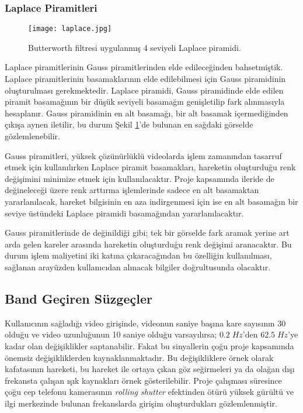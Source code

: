 \documentclass[a4paper, 12pt]{article}
\begin{document}
\subsubsection{Laplace Piramitleri}{\label{laplace-piramit}}

\begin{figure}[h]
	\begin{center}
	\texttt{[image: laplace.jpg]}
	\caption{Butterworth filtresi uygulanmış 4 seviyeli Laplace piramidi.}
		\label{laplace-piramit-ornek}
	\end{center}
\end{figure}
\vspace{-0.5cm}

Laplace piramitlerinin Gauss piramitlerinden elde edileceğinden bahsetmiştik. Laplace piramitlerinin basamaklarının elde edilebilmesi için Gauss piramidinin oluşturulması gerekmektedir. Laplace piramidi, Gauss piramidinde elde edilen piramit basamağının bir düşük seviyeli basamağın genişletilip fark alınmasıyla hesaplanır. Gauss piramidinin en alt basamağı, bir alt basamak içermediğinden çıkışa aynen iletilir, bu durum Şekil \ref{laplace-piramit-ornek}'de bulunan en sağdaki görselde gözlemlenebilir.

Gauss piramitleri, yüksek çözünürlüklü videolarda işlem zamanından tasarruf etmek için kullanılırken Laplace piramit basamakları, hareketin oluşturduğu renk değişimini minimize etmek için kullanılacaktır. Proje kapsamında ileride de değineleceği üzere renk arttırma işlemlerinde sadece en alt basamaktan yararlanılacak, hareket bilgisinin en aza indirgenmesi için ise en alt basamağın bir seviye üstündeki Laplace piramidi basamağından yararlanılacaktır. 

Gauss piramitlerinde de değinildiği gibi; tek bir görselde fark aramak yerine art arda gelen kareler arasında hareketin oluşturduğu renk değişimi aranacaktır. Bu durum işlem maliyetini iki katına çıkaracağından bu özelliğin kullanılması, sağlanan arayüzden kullanıcıdan alınacak bilgiler doğrultusunda olacaktır.



\subsection{Band Geçiren Süzgeçler}{\label{band-geciren-suzgec}}

Kullanıcının sağladığı video girişinde, videonun saniye başına kare sayısının 30 olduğu ve video uzunluğunun 10 saniye olduğu varsayılırsa; $0.2\; Hz$'den $62.5\; Hz$'ye kadar olan değişiklikler saptanabilir. Fakat bu sinyallerin çoğu proje kapsamında önemsiz değişikliklerden kaynaklanmaktadır. Bu değişikliklere örnek olarak kafatasının hareketi\cite{YQIF}, bu hareket ile ortaya çıkan göz seğirmeleri ya da olağan dışı frekansta çalışan ışık kaynakları örnek gösterilebilir. Proje çalışması süresince çoğu cep telefonu kamerasının \textit{rolling shutter} efektinden ötürü yüksek gürültü ve ilgi merkezinde bulunan frekanslarda girişim oluşturdukları gözlemlenmiştir.
\end{document}
